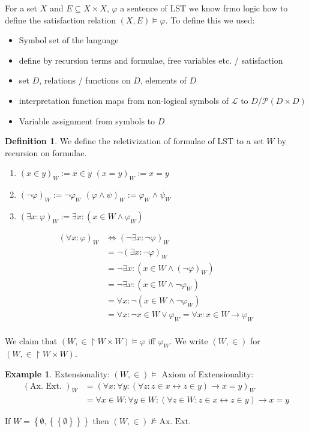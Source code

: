 \documentclass{scrartcl}
\renewcommand{\P}{\mathcal{P}}
\renewcommand{\L}{\mathcal{L}}
\newcommand{\set}[1]{\left\{#1\right\}}
\theoremstyle{definition}
\newtheorem*{definition*}{Definition}
\newtheorem*{example*}{Example}
\theoremstyle{plain}
\theoremstyle{remark}
\begin{document}
	For a set $X$ and $E \subseteq X\times X$, $\varphi$ a sentence of LST we know frmo logic how to define the satisfaction relation $(X, E) \vDash \varphi$. To define this we used:
	\begin{itemize}
		\item Symbol set of the language 
		\item define by recursion terms and formulae, free variables etc. / satisfaction 
		\item set $D$, relations / functions on $D$, elements of $D$
		\item interpretation function maps from non-logical symbols of $\L$ to $D$/$\P(D\times D)$
		\item Variable assignment from symbols to $D$
	\end{itemize}

	\begin{definition*}
		We define the reletivization of formulae of LST to a set $W$ by recursion on formulae.
		\begin{enumerate}[1.]
			\item $(x \in y)_W := x \in y$ \hfill $(x=y)_W := x=y$ 
			\item $(\lnot \varphi)_W := \lnot \varphi_W$ \hfill $(\varphi \land \psi)_W := \varphi_W \land \psi_W$
			\item $(\exists x: \varphi)_W := \exists x: (x\in W \land \varphi_W)$
		\end{enumerate}
	\end{definition*}

	\begin{align*}
		(\forall x: \varphi)_W &\iff (\lnot \exists x: \lnot \varphi)_W\\
		&=  \lnot (\exists x: \lnot \varphi)_W\\
		&=  \lnot \exists x: (x \in W \land (\lnot \varphi)_W) \\
		&=  \lnot \exists x: (x \in W \land \lnot \varphi_W) \\
		&=  \forall x: \lnot (x \in W \land \lnot \varphi_W) \\
		&=  \forall x: \lnot x \in W \lor \varphi_W = \forall x: x \in W \longrightarrow \varphi_W \\
	\end{align*}
	
	We claim that $(W, \in \restriction W \times W) \vDash \varphi $ iff $\varphi_W$. We write $(W, \in)$ for $(W, \in \restriction W \times W)$.
	
	\begin{example*}
		Extensionality: $(W, \in) \vDash $ Axiom of Extensionality:
		\begin{align*}
			(\text{Ax. Ext. })_W &= (\forall x: \forall y: (\forall z: z \in x \longleftrightarrow z \in y) \longrightarrow x = y)_W\\
			&= \forall x \in W: \forall y \in W: (\forall z \in W: z \in x \longleftrightarrow z \in y) \longrightarrow x = y
		\end{align*}
	
		If $W = \set{\emptyset, \set{\set{\emptyset}}}$ then $(W, \in) \nvDash \text{Ax. Ext.}$
	\end{example*}
	
\end{document}
